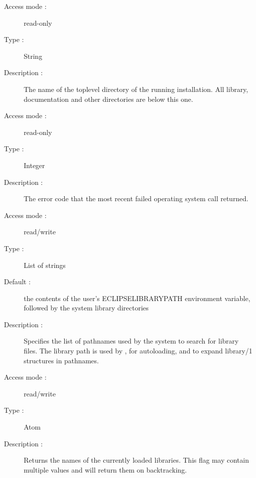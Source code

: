 \begin{description}
\begin{description}
\item[Access mode :] read-only
\item[Type :] String
\item[Description :] The name of the toplevel directory of the
running {\eclipse} installation. All {\eclipse} library, documentation and
other directories are below this one.
\end{description}


\begin{description}
\item[Access mode :] read-only
\item[Type :] Integer
\item[Description :] The error code that the most recent failed
operating system call returned.
\end{description}

\begin{description}
\item[Access mode :] read/write 
\item[Type :] List of strings 
\item[Default : ] the contents of the user's ECLIPSELIBRARYPATH environment
variable, followed by the system library directories
\item[Description :] Specifies the list of pathnames used by the system to
search for library files.
The library path is used by , for autoloading, and to expand
library/1 structures in pathnames.
\end{description}

\begin{description}
\item[Access mode : ] read/write
\item[Type : ] Atom 
\item[Description : ] Returns the names of the currently loaded libraries.
This flag may contain multiple values and will return them on backtracking.
\end{description}


\end{description}

